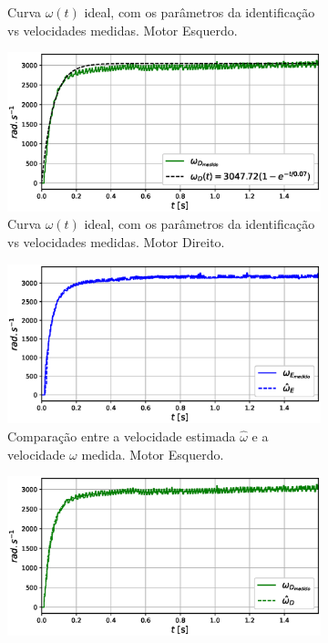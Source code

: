 \begin{figure}[H]
\begin{subfigure}{.5\textwidth}
    \caption{Curva $\omega(t)$ ideal, com os parâmetros da identificação vs velocidades medidas. Motor Esquerdo.}
    \label{fig:exp01:regressao_medido_esquerdo}
    \end{subfigure}
    \hfill
    \begin{subfigure}{.5\textwidth}
    \centering
    \includegraphics[width=\textwidth]{figuras/resultados/exp01/regressao_vs_medido_direito100.eps}
    \caption{Curva $\omega(t)$ ideal, com os parâmetros da identificação vs velocidades medidas. Motor Direito.}
    \label{fig:exp01:regressao_medido_direito}
    \end{subfigure}
    \hfill
    \begin{subfigure}{.5\textwidth}
    \centering
    \includegraphics[width=\textwidth]{figuras/resultados/exp01/filtro_vs_sem_filtro_esquerdo100.eps}
    \caption{Comparação entre a velocidade estimada $\hat{\omega}$ e a velocidade $\omega$ medida. Motor Esquerdo.}
    \label{fig:exp01:filtragem_esquerdo}
    \end{subfigure}
    \hfill
    \begin{subfigure}{.5\textwidth}
    \centering
    \includegraphics[width=\textwidth]{figuras/resultados/exp01/filtro_vs_sem_filtro_direito100.eps}

\end{subfigure}
\end{figure}
